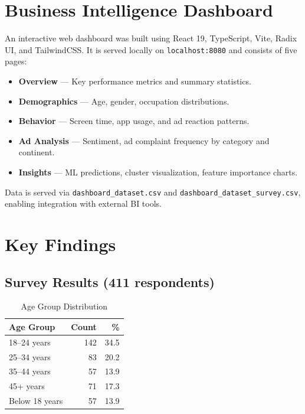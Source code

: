 \documentclass[12pt]{article}
\begin{document}
\section{Business Intelligence Dashboard}

An interactive web dashboard was built using React 19, TypeScript, Vite, Radix UI, and TailwindCSS. It is served locally on \texttt{localhost:8080} and consists of five pages:

\begin{itemize}
    \item \textbf{Overview} — Key performance metrics and summary statistics.
    \item \textbf{Demographics} — Age, gender, occupation distributions.
    \item \textbf{Behavior} — Screen time, app usage, and ad reaction patterns.
    \item \textbf{Ad Analysis} — Sentiment, ad complaint frequency by category and continent.
    \item \textbf{Insights} — ML predictions, cluster visualization, feature importance charts.
\end{itemize}

Data is served via \texttt{dashboard\_dataset.csv} and \texttt{dashboard\_dataset\_survey.csv}, enabling integration with external BI tools.

\section{Key Findings}

\subsection{Survey Results (411 respondents)}

\begin{table}[H]
\centering
\begin{tabular}{lrr}
\toprule
\textbf{Age Group} & \textbf{Count} & \textbf{\%} \\
\midrule
18--24 years   & 142 & 34.5 \\
25--34 years   & 83  & 20.2 \\
35--44 years   & 57  & 13.9 \\
45+ years      & 71  & 17.3 \\
Below 18 years & 57  & 13.9 \\
\bottomrule
\end{tabular}
\caption{Age Group Distribution}
\end{table}
\end{document}
